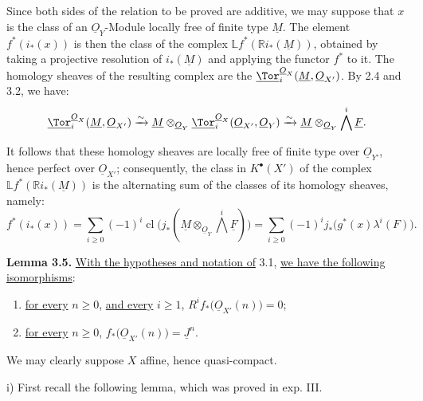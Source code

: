 Since both sides of the relation to be proved are additive, we may suppose that \(x\) is the class of an \(\underline{O}_Y\)-Module locally free of finite type \(\underline{M}\). The element \(f^*(i_*(x))\) is then the class of the complex \(\mathbb Lf^*(\mathbb Ri_*(\underline{M}))\), obtained by taking a projective resolution of \(i_*(\underline{M})\) and applying the functor \(f^*\) to it. The homology sheaves of the resulting complex are the \(\underline{\Tor}_i^{\underline{O}_X}(\underline{M},\underline{O}_{X'})\). By 2.4 and 3.2, we have:
\[
\underline{\Tor}_i^{\underline{O}_X}(\underline{M},\underline{O}_{X'})
\xrightarrow{\sim}
\underline{M}\otimes_{\underline{O}_Y}\underline{\Tor}_i^{\underline{O}_X}(\underline{O}_{X'},\underline{O}_Y)
\xrightarrow{\sim}
\underline{M}\otimes_{\underline{O}_Y}\bigwedge^i\underline{F}.
\]

It follows that these homology sheaves are locally free of finite type over \(\underline{O}_{Y'}\), hence perfect over \(\underline{O}_{X'}\); consequently, the class in \(K^{\bullet}(X')\) of the complex \(\mathbb Lf^*(\mathbb Ri_*(\underline{M}))\) is the alternating sum of the classes of its homology sheaves, namely:
\[
f^*(i_*(x))
=\sum_{i\ge0}(-1)^i\operatorname{cl}
\bigl(j_*(\underline{M}\otimes_{\underline{O}_Y}\bigwedge^i\underline{F})\bigr)
=\sum_{i\ge0}(-1)^i
j_*\bigl(g^*(x)\lambda^i(F)\bigr).
\]

\textbf{Lemma 3.5.} \uline{With the hypotheses and notation of} 3.1, \uline{we have the following isomorphisms}:
\begin{enumerate}[label=\roman*)]
\item \uline{for every} \(n\ge0\), \uline{and every} \(i\ge1\), \(R^if_*\bigl(\underline{O}_{X'}(n)\bigr)=0\);
\item \uline{for every} \(n\ge0\), \(f_*\bigl(\underline{O}_{X'}(n)\bigr)=\underline{J}^n\).
\end{enumerate}

We may clearly suppose \(X\) affine, hence quasi-compact.

i) First recall the following lemma, which was proved in exp. III.

